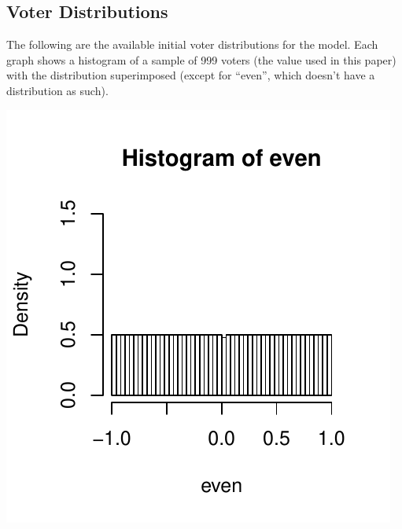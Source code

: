 \documentclass[12pt]{article}
\numberwithin{equation}{subsection}
\begin{document}
\newpage

\appendix

\begin{samepage}

\section{Voter Distributions}\label{app:dists}

The following are the available initial voter distributions for the model.  Each graph
shows a histogram of a sample of 999 voters (the value used in this paper) with the
distribution superimposed (except for ``even'', which doesn't have a distribution as such).

\includegraphics[page=1]{dists.pdf}

\end{samepage}
\end{document}
